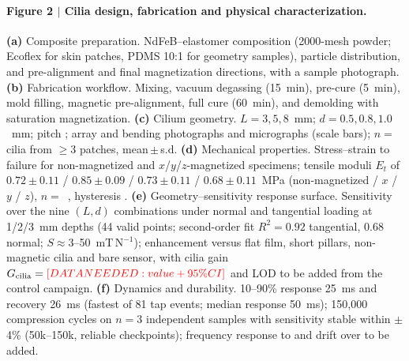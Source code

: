 \paragraph{Figure 2 $\vert$ Cilia design, fabrication and physical
characterization.}
\textbf{(a)} Composite preparation. NdFeB--elastomer composition (2000-mesh
powder; Ecoflex for skin patches, PDMS 10:1 for geometry samples), particle
distribution, and pre-alignment and final magnetization directions, with a
sample photograph.
\textbf{(b)} Fabrication workflow. Mixing, vacuum degassing (15~min),
pre-cure (5~min), mold filling, magnetic pre-alignment, full cure (60~min),
and demolding with saturation magnetization.
\textbf{(c)} Cilium geometry. $L=3,5,8$~mm; $d=0.5,0.8,1.0$~mm; pitch
; array and bending photographs and micrographs (scale bars);
$n=$~ cilia from $\geq 3$ patches, mean\,$\pm$\,s.d.
\textbf{(d)} Mechanical properties. Stress--strain to failure for
non-magnetized and $x$/$y$/$z$-magnetized specimens; tensile moduli $E_t$ of
$0.72\pm0.11$ / $0.85\pm0.09$ / $0.73\pm0.11$ / $0.68\pm0.11$~MPa
(non-magnetized / $x$ / $y$ / $z$), $n=$~,
hysteresis \dataneeded{\%}.
\textbf{(e)} Geometry--sensitivity response surface. Sensitivity over the
nine $(L,d)$ combinations under normal and tangential loading at 1/2/3~mm
depths (44 valid points; second-order fit $R^2=0.92$ tangential, $0.68$
normal; $S\approx$3--50~mT\,N$^{-1}$); enhancement versus flat film, short
pillars, non-magnetic cilia and bare sensor, with cilia gain
$G_{\mathrm{cilia}}=\textcolor{red}{[DATA NEEDED: value + 95\% CI]}$ and LOD 
to be added from the control campaign.
\textbf{(f)} Dynamics and durability. 10--90\% response 25~ms and recovery
26~ms (fastest of 81 tap events; median response 50~ms); 150{,}000
compression cycles on $n=3$ independent samples with sensitivity stable
within $\pm$4\% (50k--150k, reliable checkpoints); frequency response to
 and drift over  to be added.

